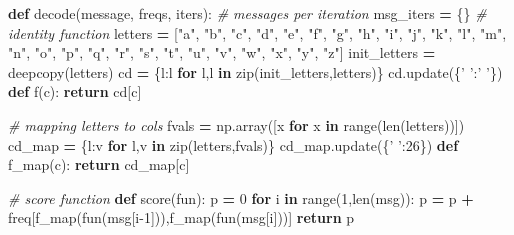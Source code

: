 \documentclass[]{article}
\newenvironment{Shaded}{\begin{snugshade}}{\end{snugshade}}
\newcommand{\BuiltInTok}[1]{#1}
\newcommand{\CommentTok}[1]{\textcolor[rgb]{0.56,0.35,0.01}{\textit{#1}}}
\newcommand{\ControlFlowTok}[1]{\textcolor[rgb]{0.13,0.29,0.53}{\textbf{#1}}}
\newcommand{\DecValTok}[1]{\textcolor[rgb]{0.00,0.00,0.81}{#1}}
\newcommand{\KeywordTok}[1]{\textcolor[rgb]{0.13,0.29,0.53}{\textbf{#1}}}
\newcommand{\NormalTok}[1]{#1}
\newcommand{\OperatorTok}[1]{\textcolor[rgb]{0.81,0.36,0.00}{\textbf{#1}}}
\newcommand{\StringTok}[1]{\textcolor[rgb]{0.31,0.60,0.02}{#1}}
\begin{document}
\begin{Shaded}
\begin{Highlighting}[]
\KeywordTok{def}\NormalTok{ decode(message, freqs, iters):}
    \CommentTok{# messages per iteration}
\NormalTok{    msg_iters }\OperatorTok{=}\NormalTok{ \{\}}
    \CommentTok{# identity function}
\NormalTok{    letters }\OperatorTok{=}\NormalTok{ [}\StringTok{"a"}\NormalTok{, }\StringTok{"b"}\NormalTok{, }\StringTok{"c"}\NormalTok{, }\StringTok{"d"}\NormalTok{,}
                \StringTok{"e"}\NormalTok{, }\StringTok{"f"}\NormalTok{, }\StringTok{"g"}\NormalTok{, }\StringTok{"h"}\NormalTok{, }
                \StringTok{"i"}\NormalTok{, }\StringTok{"j"}\NormalTok{, }\StringTok{"k"}\NormalTok{, }\StringTok{"l"}\NormalTok{, }
                \StringTok{"m"}\NormalTok{, }\StringTok{"n"}\NormalTok{, }\StringTok{"o"}\NormalTok{, }\StringTok{"p"}\NormalTok{, }
                \StringTok{"q"}\NormalTok{, }\StringTok{"r"}\NormalTok{, }\StringTok{"s"}\NormalTok{, }\StringTok{"t"}\NormalTok{, }
                \StringTok{"u"}\NormalTok{, }\StringTok{"v"}\NormalTok{, }\StringTok{"w"}\NormalTok{, }\StringTok{"x"}\NormalTok{, }
                \StringTok{"y"}\NormalTok{, }\StringTok{"z"}\NormalTok{]}
\NormalTok{    init_letters }\OperatorTok{=}\NormalTok{ deepcopy(letters)}
\NormalTok{    cd }\OperatorTok{=}\NormalTok{ \{l:l }\ControlFlowTok{for}\NormalTok{ l,l }\KeywordTok{in} \BuiltInTok{zip}\NormalTok{(init_letters,letters)\}}
\NormalTok{    cd.update(\{}\StringTok{' '}\NormalTok{:}\StringTok{' '}\NormalTok{\})}
    \KeywordTok{def}\NormalTok{ f(c):}
        \ControlFlowTok{return}\NormalTok{ cd[c]}
    
    \CommentTok{# mapping letters to cols}
\NormalTok{    fvals }\OperatorTok{=}\NormalTok{ np.array([x }\ControlFlowTok{for}\NormalTok{ x }\KeywordTok{in} \BuiltInTok{range}\NormalTok{(}\BuiltInTok{len}\NormalTok{(letters))])}
\NormalTok{    cd_map }\OperatorTok{=}\NormalTok{ \{l:v }\ControlFlowTok{for}\NormalTok{ l,v }\KeywordTok{in} \BuiltInTok{zip}\NormalTok{(letters,fvals)\}}
\NormalTok{    cd_map.update(\{}\StringTok{' '}\NormalTok{:}\DecValTok{26}\NormalTok{\})}
    \KeywordTok{def}\NormalTok{ f_map(c):}
        \ControlFlowTok{return}\NormalTok{ cd_map[c]}

    \CommentTok{# score function}
    \KeywordTok{def}\NormalTok{ score(fun):}
\NormalTok{        p }\OperatorTok{=} \DecValTok{0}
        \ControlFlowTok{for}\NormalTok{ i }\KeywordTok{in} \BuiltInTok{range}\NormalTok{(}\DecValTok{1}\NormalTok{,}\BuiltInTok{len}\NormalTok{(msg)):}
\NormalTok{            p }\OperatorTok{=}\NormalTok{ p }\OperatorTok{+}\NormalTok{ freq[f_map(fun(msg[i}\DecValTok{-1}\NormalTok{])),f_map(fun(msg[i]))]}
        \ControlFlowTok{return}\NormalTok{ p}
    

\end{Highlighting}
\end{Shaded}
\end{document}

